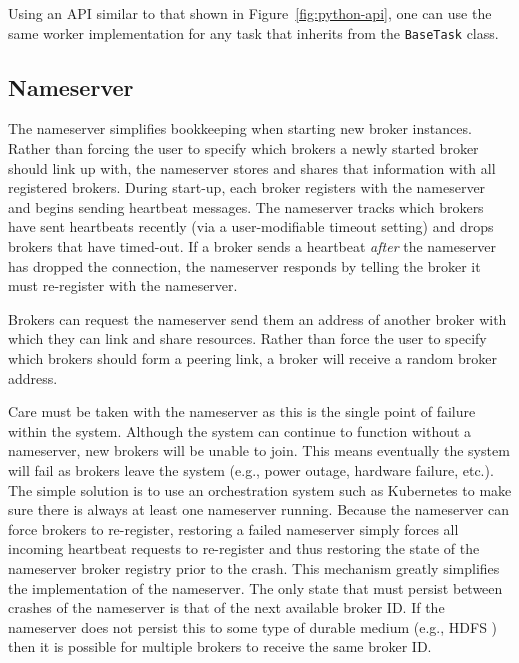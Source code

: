 \documentclass[conference]{IEEEtran}
\begin{document}
Using an API similar to that shown in Figure~\ref{fig:python-api}, one can use
the same worker implementation for any task that inherits from the \texttt{BaseTask}
class.

\subsection{Nameserver}
The nameserver simplifies bookkeeping when starting new broker instances.
Rather than forcing the user to specify which brokers a newly started broker
should link up with, the nameserver stores and shares that information with
all registered brokers. During start-up, each broker registers with the nameserver
and begins sending heartbeat messages. The nameserver tracks which brokers have
sent heartbeats recently (via a user-modifiable timeout setting) and drops brokers
that have timed-out. If a broker sends a heartbeat \emph{after} the nameserver has
dropped the connection, the nameserver responds by telling the broker it must
re-register with the nameserver.

Brokers can request the nameserver send them an address of another broker with
which they can link and share resources. Rather than force the user to specify
which brokers should form a peering link, a broker will receive a random broker
address.

Care must be taken with the nameserver as this is the single point of failure
within the system. Although the system can continue to function without a
nameserver, new brokers will be unable to join. This means eventually the system
will fail as brokers leave the system (e.g., power outage, hardware failure, etc.).
The simple solution is to use an orchestration system such as Kubernetes to make
sure there is always at least one nameserver running. Because the nameserver
can force brokers to re-register, restoring a failed nameserver simply forces all
incoming heartbeat requests to re-register and thus restoring the state of the
nameserver broker registry prior to the crash. This mechanism greatly simplifies
the implementation of the nameserver. The only state that must persist between
crashes of the nameserver is that of the next available broker ID. If the nameserver
does not persist this to some type of durable medium (e.g., HDFS
\cite{Shvachko:2010:HDF:1913798.1914427}) then it is possible for multiple brokers
to receive the same broker ID.
\end{document}
